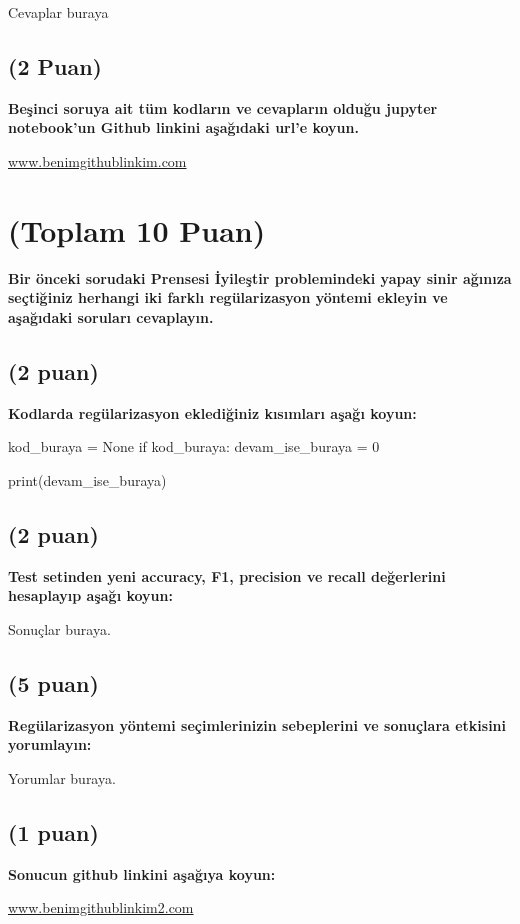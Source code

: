 \documentclass[11pt]{article}
\begin{document}
Cevaplar buraya

\begin{comment}
\begin{figure}[ht!]
    \centering
    \texttt{[image: mypicturehere.png]}
    \caption{Buraya açıklama yazın}
    \label{fig:my_pic}
\end{figure}
\end{comment}

\subsection{(2 Puan)} \textbf{Beşinci soruya ait tüm kodların ve cevapların olduğu jupyter notebook'un Github linkini aşağıdaki url'e koyun.}

\url{www.benimgithublinkim.com}

\section{(Toplam 10 Puan)} \textbf{Bir önceki sorudaki Prensesi İyileştir problemindeki yapay sinir ağınıza seçtiğiniz herhangi iki farklı regülarizasyon yöntemi ekleyin ve aşağıdaki soruları cevaplayın.} 

\subsection{(2 puan)} \textbf{Kodlarda regülarizasyon eklediğiniz kısımları aşağı koyun:} 

\begin{python}
kod_buraya = None
if kod_buraya:
    devam_ise_buraya = 0

print(devam_ise_buraya)
\end{python}

\subsection{(2 puan)} \textbf{Test setinden yeni accuracy, F1, precision ve recall değerlerini hesaplayıp aşağı koyun:}

Sonuçlar buraya.

\subsection{(5 puan)} \textbf{Regülarizasyon yöntemi seçimlerinizin sebeplerini ve sonuçlara etkisini yorumlayın:}

Yorumlar buraya.

\subsection{(1 puan)} \textbf{Sonucun github linkini  aşağıya koyun:}

\url{www.benimgithublinkim2.com}
\end{document}
